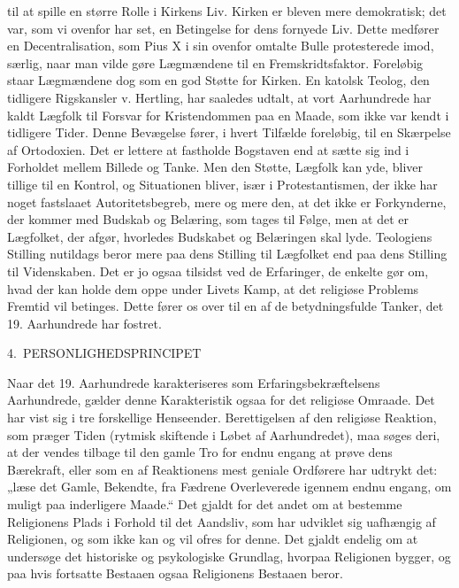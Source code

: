 \documentclass[12pt,a4paper,openany]{book}
\newcommand{\opage}[1]{\marginnote{\footnotesize\textit{[#1]}}}
\newcommand{\chapterhead}[2]{\par\bigskip\phantomsection\begin{center}{\large #1\ #2}\end{center}\addcontentsline{toc}{chapter}{#1 #2}\medskip}
\begin{document}
til at spille en større Rolle i Kirkens Liv. Kirken er bleven mere
demokratisk; det var, som vi ovenfor har set, en Betingelse for dens
fornyede Liv. Dette medfører en Decentralisation, som Pius X i sin
ovenfor omtalte Bulle protesterede imod, særlig, naar man vilde gøre
Lægmændene til en Fremskridtsfaktor. Foreløbig staar Lægmændene
dog som en god Støtte for Kirken. En katolsk Teolog, den tidligere
Rigskansler v. Hertling, har saaledes udtalt, at vort Aarhundrede har
kaldt Lægfolk til Forsvar for Kristendommen paa en Maade, som ikke
var kendt i tidligere Tider. Denne Bevægelse fører, i hvert Tilfælde
foreløbig, til en Skærpelse af Ortodoxien. Det er lettere at fastholde
Bogstaven end at sætte sig ind i Forholdet mellem Billede og Tanke.
Men den Støtte, Lægfolk kan yde, bliver tillige til en Kontrol, og
Situationen bliver, især i Protestantismen, der ikke har noget fastslaaet
Autoritetsbegreb, mere og mere den, at det ikke er Forkynderne,
der kommer med Budskab og Belæring, som tages til Følge,
men at det er Lægfolket, der afgør, hvorledes Budskabet og Belæringen
skal lyde. Teologiens Stilling nutildags beror mere paa dens
Stilling til Lægfolket end paa dens Stilling til Videnskaben. Det er
\opage{137}jo ogsaa tilsidst ved de Erfaringer, de enkelte gør om, hvad der kan
holde dem oppe under Livets Kamp, at det religiøse Problems Fremtid
vil betinges. Dette fører os over til en af de betydningsfulde Tanker,
det 19. Aarhundrede har fostret.

\chapterhead{4.}{PERSONLIGHEDSPRINCIPET}

Naar det 19. Aarhundrede karakteriseres som Erfaringsbekræftelsens
Aarhundrede, gælder denne Karakteristik ogsaa for det religiøse
Omraade. Det har vist sig i tre forskellige Henseender. Berettigelsen
af den religiøse Reaktion, som præger Tiden (rytmisk skiftende i
Løbet af Aarhundredet), maa søges deri, at der vendes tilbage til
den gamle Tro for endnu engang at prøve dens Bærekraft, eller som
en af Reaktionens mest geniale Ordførere har udtrykt det: „læse det
Gamle, Bekendte, fra Fædrene Overleverede igennem endnu engang,
om muligt paa inderligere Maade.“ Det gjaldt for det andet
om at bestemme Religionens Plads i Forhold til det Aandsliv, som
har udviklet sig uafhængig af Religionen, og som ikke kan og vil
ofres for denne. Det gjaldt endelig om at undersøge det historiske
og psykologiske Grundlag, hvorpaa Religionen bygger, og paa hvis
fortsatte Bestaaen ogsaa Religionens Bestaaen beror.
\end{document}
